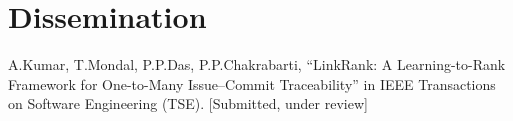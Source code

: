 \section{Dissemination}

A.Kumar, T.Mondal, P.P.Das, P.P.Chakrabarti, “LinkRank: A Learning-to-Rank Framework for One-to-Many Issue–Commit Traceability” in IEEE Transactions on Software Engineering (TSE). [Submitted, under review]



